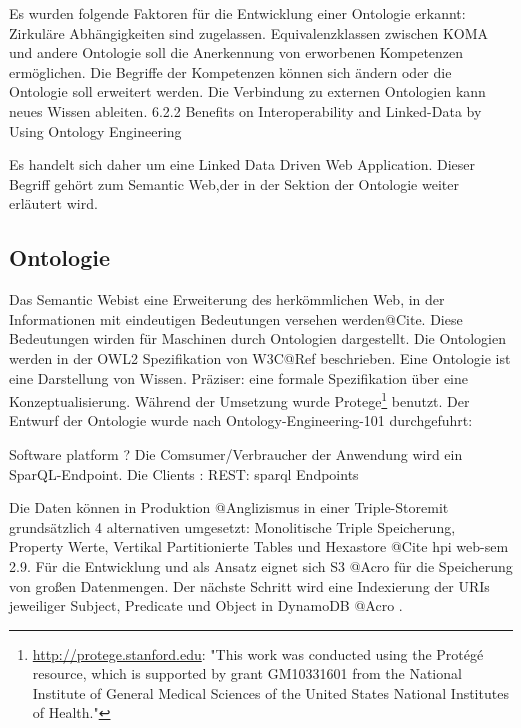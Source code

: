 \documentclass[
12pt,
english,
ngerman,
headsepline,
twoside,
openright,
numbers=noenddot,version=first
]{scrreprt}
\begin{document}
Es wurden folgende Faktoren für die Entwicklung einer Ontologie erkannt:
Zirkuläre Abhängigkeiten sind zugelassen.  
Equivalenzklassen zwischen KOMA und andere Ontologie soll die Anerkennung von erworbenen Kompetenzen ermöglichen.
Die Begriffe der Kompetenzen können sich ändern oder die Ontologie soll erweitert werden.
Die Verbindung zu externen Ontologien kann neues Wissen ableiten.
6.2.2 \cite{OntoCloud}Benefits on Interoperability and Linked-Data by Using
Ontology Engineering

Es handelt sich daher um eine \glqq Linked Data Driven Web Application\grqq.%
Dieser Begriff gehört zum \glqq Semantic Web\grqq,der in der Sektion der Ontologie weiter erläutert wird. 

\subsection{Ontologie}

Das \glqq Semantic Web\grqq ist eine Erweiterung des herkömmlichen Web, in der Informationen mit eindeutigen Bedeutungen versehen werden@Cite. Diese Bedeutungen wirden für Maschinen durch Ontologien dargestellt. Die Ontologien werden in der OWL2 Spezifikation von W3C@Ref beschrieben. 
Eine Ontologie ist eine Darstellung von Wissen. Präziser: eine formale Spezifikation über eine Konzeptualisierung\cite{OntoWhat}.
Während der Umsetzung wurde Protege\footnote{\url{http://protege.stanford.edu}: "This work was conducted using the Protégé resource, which is supported by grant GM10331601 from the National Institute of General Medical Sciences of the United States National Institutes of Health."} benutzt.
Der Entwurf der Ontologie wurde nach Ontology-Engineering-101 durchgefuhrt: 


Software platform ? 
Die Comsumer/Verbraucher der Anwendung wird ein SparQL-Endpoint\cite{SparqlLearn}.
Die Clients : REST: sparql Endpoints

Die Daten können in Produktion @Anglizismus in einer \glqq Triple-Store\grqq mit grundsätzlich 4 alternativen umgesetzt: Monolitische Triple Speicherung, Property Werte, Vertikal Partitionierte Tables und Hexastore @Cite hpi web-sem 2.9. 
Für die Entwicklung und als Ansatz eignet sich S3 @Acro für die Speicherung von großen Datenmengen. Der nächste Schritt wird eine Indexierung der URIs jeweiliger Subject, Predicate und Object in DynamoDB @Acro .
\end{document}
